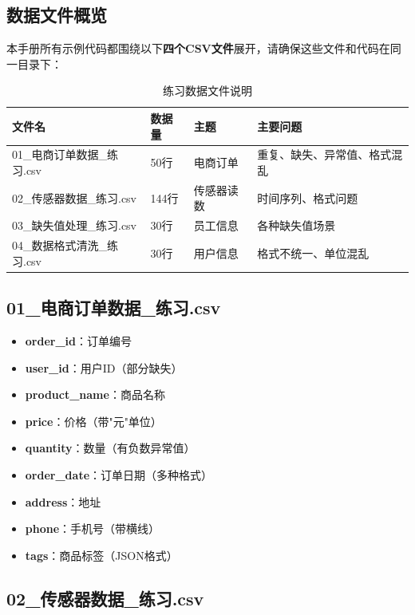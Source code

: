 \documentclass[12pt,a4paper]{article}
\begin{document}
\subsection{数据文件概览}

本手册所有示例代码都围绕以下\textbf{四个CSV文件}展开，请确保这些文件和代码在同一目录下：

\begin{table}[H]
\centering
\caption{练习数据文件说明}
\begin{tabular}{|l|l|l|l|}
\hline
\textbf{文件名} & \textbf{数据量} & \textbf{主题} & \textbf{主要问题} \\
\hline
01\_电商订单数据\_练习.csv & 50行 & 电商订单 & 重复、缺失、异常值、格式混乱 \\
\hline
02\_传感器数据\_练习.csv & 144行 & 传感器读数 & 时间序列、格式问题 \\
\hline
03\_缺失值处理\_练习.csv & 30行 & 员工信息 & 各种缺失值场景 \\
\hline
04\_数据格式清洗\_练习.csv & 30行 & 用户信息 & 格式不统一、单位混乱 \\
\hline
\end{tabular}
\end{table}

\subsection{01\_电商订单数据\_练习.csv}

\begin{knowledgebox}[数据字段说明]
\begin{itemize}
    \item \textbf{order\_id}：订单编号
    \item \textbf{user\_id}：用户ID（部分缺失）
    \item \textbf{product\_name}：商品名称
    \item \textbf{price}：价格（带"元"单位）
    \item \textbf{quantity}：数量（有负数异常值）
    \item \textbf{order\_date}：订单日期（多种格式）
    \item \textbf{address}：地址
    \item \textbf{phone}：手机号（带横线）
    \item \textbf{tags}：商品标签（JSON格式）
\end{itemize}
\end{knowledgebox}

\subsection{02\_传感器数据\_练习.csv}
\end{document}
